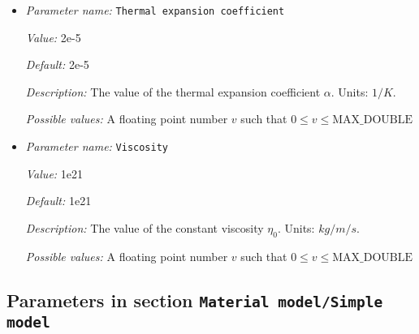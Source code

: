 \begin{itemize}
{\it Description:} The value of the thermal conductivity $k$. Units: $W/m/K$.


{\it Possible values:} A floating point number $v$ such that $0 \leq v \leq \text{MAX\_DOUBLE}$
\item {\it Parameter name:} {\tt Thermal expansion coefficient}
\label{parameters:Material model/Simple compressible model/Thermal expansion coefficient}


{\it Value:} 2e-5


{\it Default:} 2e-5


{\it Description:} The value of the thermal expansion coefficient $\alpha$. Units: $1/K$.


{\it Possible values:} A floating point number $v$ such that $0 \leq v \leq \text{MAX\_DOUBLE}$
\item {\it Parameter name:} {\tt Viscosity}
\label{parameters:Material model/Simple compressible model/Viscosity}


{\it Value:} 1e21


{\it Default:} 1e21


{\it Description:} The value of the constant viscosity $\eta_0$. Units: $kg/m/s$.


{\it Possible values:} A floating point number $v$ such that $0 \leq v \leq \text{MAX\_DOUBLE}$
\end{itemize}

\subsection{Parameters in section \tt Material model/Simple model}
\label{parameters:Material_20model/Simple_20model}

